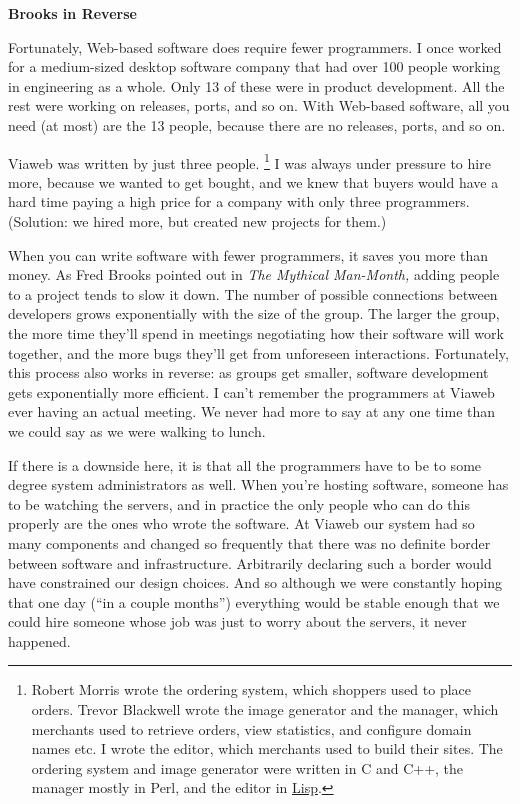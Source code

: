 \documentclass[12pt]{book}
\begin{document}
\textbf{Brooks in Reverse}

Fortunately, Web-based software does require fewer programmers. I once
worked for a medium-sized desktop software company that had over 100
people working in engineering as a whole. Only 13 of these were in
product development. All the rest were working on releases, ports, and
so on. With Web-based software, all you need (at most) are the 13
people, because there are no releases, ports, and so on.

Viaweb was written by just three people. \footnote{Robert Morris wrote the ordering system, which shoppers used to
place orders. Trevor Blackwell wrote the image generator and the
manager, which merchants used to retrieve orders, view statistics, and
configure domain names etc. I wrote the editor, which merchants used to
build their sites. The ordering system and image generator were written
in C and C++, the manager mostly in Perl, and the editor in
\href{avg.html}{Lisp}.} I was always under
pressure to hire more, because we wanted to get bought, and we knew that
buyers would have a hard time paying a high price for a company with
only three programmers. (Solution: we hired more, but created new
projects for them.)

When you can write software with fewer programmers, it saves you more
than money. As Fred Brooks pointed out in \emph{The Mythical Man-Month,}
adding people to a project tends to slow it down. The number of possible
connections between developers grows exponentially with the size of the
group. The larger the group, the more time they'll spend in meetings
negotiating how their software will work together, and the more bugs
they'll get from unforeseen interactions. Fortunately, this process also
works in reverse: as groups get smaller, software development gets
exponentially more efficient. I can't remember the programmers at Viaweb
ever having an actual meeting. We never had more to say at any one time
than we could say as we were walking to lunch.

If there is a downside here, it is that all the programmers have to be
to some degree system administrators as well. When you're hosting
software, someone has to be watching the servers, and in practice the
only people who can do this properly are the ones who wrote the
software. At Viaweb our system had so many components and changed so
frequently that there was no definite border between software and
infrastructure. Arbitrarily declaring such a border would have
constrained our design choices. And so although we were constantly
hoping that one day (``in a couple months'') everything would be stable
enough that we could hire someone whose job was just to worry about the
servers, it never happened.
\end{document}
